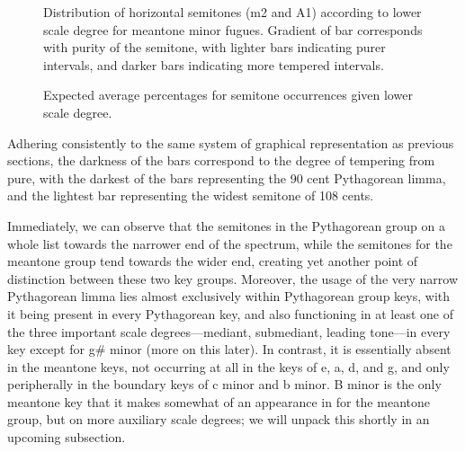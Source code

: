 \begin{figure}[H]
\vspace{1.5em}
    \centering
    \caption[Distribution of horizontal semitones, according to lower scale degree for meantone minor fugues. ]{Distribution of horizontal semitones (m2 and A1) according to lower scale degree for meantone minor fugues. Gradient of bar corresponds with purity of the semitone, with lighter bars indicating purer intervals, and darker bars indicating more tempered intervals.}
\end{figure}


\begin{figure}[H]
\vspace{1.5em}
    \centering
    \caption{Expected average percentages for semitone occurrences given lower scale degree. }
\end{figure}    Adhering consistently to the same system of graphical representation as
previous sections, the darkness of the bars correspond to the degree of
tempering from pure, with the darkest of the bars representing the 90
cent Pythagorean limma, and the lightest bar representing the widest
semitone of 108 cents.

Immediately, we can observe that the semitones in the Pythagorean group
on a whole list towards the narrower end of the spectrum, while the
semitones for the meantone group tend towards the wider end, creating
yet another point of distinction between these two key groups. Moreover,
the usage of the very narrow Pythagorean limma lies almost exclusively
within Pythagorean group keys, with it being present in every
Pythagorean key, and also functioning in at least one of the three
important scale degrees---mediant, submediant, leading tone---in
every key except for g\# minor (more on this later). In contrast, it is
essentially absent in the meantone keys, not occurring at all in the
keys of e, a, d, and g, and only peripherally in the boundary keys of c
minor and b minor. B minor is the only meantone key that it makes
somewhat of an appearance in for the meantone group, but on more
auxiliary scale degrees; we will unpack this shortly in an upcoming
subsection.

